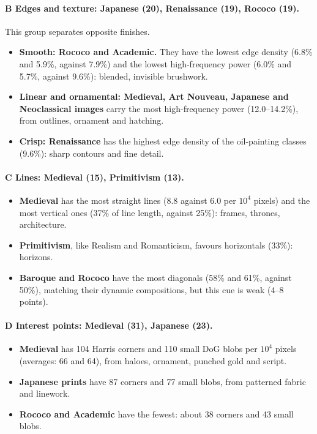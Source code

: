 \documentclass[10pt,twocolumn,a4paper]{article}
\begin{document}
\paragraph{B Edges and texture: Japanese (20), Renaissance (19), Rococo (19).}
This group separates opposite finishes.
\begin{itemize}
\item \textbf{Smooth: Rococo and Academic.} They have the lowest edge density (6.8\% and 5.9\%, against 7.9\%) and the lowest high-frequency power (6.0\% and 5.7\%, against 9.6\%): blended, invisible brushwork.
\item \textbf{Linear and ornamental: Medieval, Art Nouveau, Japanese and Neoclassical images} carry the most high-frequency power (12.0--14.2\%), from outlines, ornament and hatching.
\item \textbf{Crisp: Renaissance} has the highest edge density of the oil-painting classes (9.6\%): sharp contours and fine detail.
\end{itemize}

\paragraph{C Lines: Medieval (15), Primitivism (13).}
\begin{itemize}
\item \textbf{Medieval} has the most straight lines (8.8 against 6.0 per $10^4$ pixels) and the most vertical ones (37\% of line length, against 25\%): frames, thrones, architecture.
\item \textbf{Primitivism}, like Realism and Romanticism, favours horizontals (33\%): horizons.
\item \textbf{Baroque and Rococo} have the most diagonals (58\% and 61\%, against 50\%), matching their dynamic compositions, but this cue is weak (4--8 points).
\end{itemize}

\paragraph{D Interest points: Medieval (31), Japanese (23).}
\begin{itemize}
\item \textbf{Medieval} has 104 Harris corners and 110 small DoG blobs per $10^4$ pixels (averages: 66 and 64), from haloes, ornament, punched gold and script.
\item \textbf{Japanese prints} have 87 corners and 77 small blobs, from patterned fabric and linework.
\item \textbf{Rococo and Academic} have the fewest: about 38 corners and 43 small blobs.
\end{itemize}
\end{document}
